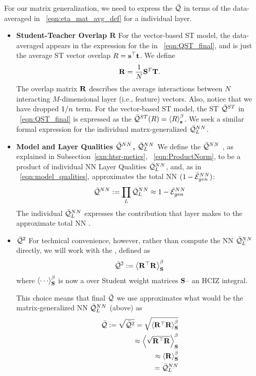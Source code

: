 For our matrix generalization, we need to express the \LayerQuality $\bar{\mathcal{Q}}$ in terms of the data-averaged
\SelfOverlap in \EQN~\ref{eqn:eta_mat_avg_def} for a individual layer.
\begin{itemize}
\item
\textbf{Student-Teacher Overlap  $\mathbf{R}$}
For the vector-based \Perceptron ST model, the data-averaged \SelfOverlap appears in the expression for the
\LayerQuality  in \EQN~\ref{eqn:QST_final}, and is just the average ST vector overlap $R={\mathbf{s}}^{\top}{\mathbf{t}}$. 
We define 
\begin{equation}
\mathbf{R} =  \frac{1}{N}{\mathbf{S}}^{T} {\mathbf{T}}  .
\end{equation}
The overlap matrix $\mathbf{R}$ describes the average interactions between $N$ interacting $M$-dimensional layer (i.e., feature) vectors.  Also, notice that we have dropped $1/n$ term.
For the vector-based ST model, the ST \Quality $\bar{\mathcal{Q}}^{ST}$ in \EQN~\ref{eqn:QST_final} is expressed as
the \ThermalAverage $\bar{\mathcal{Q}}^{ST}(R)=\left\langle R \right\rangle_{\mathbf s}^{\beta}$. We seek a similar formal expression for the individual matrx-generalized \LayerQuality $\bar{\mathcal{Q}}^{NN}_{L}$.
\item
\textbf{Model and Layer Qualities $\bar{\mathcal{Q}}^{NN}$, $\bar{\mathcal{Q}}^{NN}_{L}$}
We define the \ModelQuality $\bar{\mathcal{Q}}^{NN}$ ,
as explained in Subsection~\ref{sxn:htsr-metics}, \EQN~\ref{eqn:ProductNorm},
to be a product of individual NN Layer Qualities $\bar{\mathcal{Q}}^{NN}_{L}$,
and, as in \EQN~\ref{eqn:model_qualities},
approximates the total NN \AverageGeneralizationAccuracy $(1-\bar{\mathcal{E}}_{gen}^{NN})$:
\begin{equation}
 \bar{\mathcal{Q}}^{NN}:=\prod_{L}\bar{\mathcal{Q}}^{NN}_{L}\approx 1-\bar{\mathcal{E}}_{gen}^{NN} 
\end{equation}
The individual $\bar{\mathcal{Q}}^{NN}_{L}$ expresses the contribution that layer makes
to the approximate total NN \AverageGeneralizationAccuracy.
\item
 \textbf{\LayerQualitySquared $\bar{\mathcal{Q}}^{2}$}
For  technical convenience, however, rather than compute
the NN \LayerQuality $\bar{\mathcal{Q}}^{NN}_{L}$ directly, we will work with the \emph{\AverageLayerQualitySquared}, 
defined as
\begin{align}
  \label{eqn:QT_1}
  \bar{\mathcal{Q}}^{2}:=\left\langle {\mathbf{R}}^{\top}\mathbf{R} \right\rangle_{\mathbf S}^{\beta}
\end{align}
where  $\THRMAVGIZ{\cdots}$ is now a \ThermalAverage over Student weight matrices ${\mathbf{S}}$--
an HCIZ integral.

This choice means that final \LayerQuality $\bar{\mathcal{Q}}$ we use approximates what would be the
matrix-generalized NN \LayerQuality $\bar{\mathcal{Q}}^{NN}_{L}$ (above) as
\begin{align}
  \label{eqn:QT_2}
  \bar{\mathcal{Q}}:=\sqrt{\bar{\mathcal{Q}}^{2}}
  =\sqrt{\left\langle {\mathbf{R}}^{\top}\mathbf{R} \right\rangle_{\mathbf S}^{\beta}} \\ \nonumber
  \approx\left\langle \sqrt{{\mathbf{R}}^{\top}\mathbf{R}} \right\rangle_{\mathbf S}^{\beta} \\ \nonumber
  \approx\left\langle \mathbf{R} \right\rangle_{\mathbf S}^{\beta} \\ \nonumber
  = \bar{\mathcal{Q}}^{NN}_{L}
\end{align}


\end{itemize}
